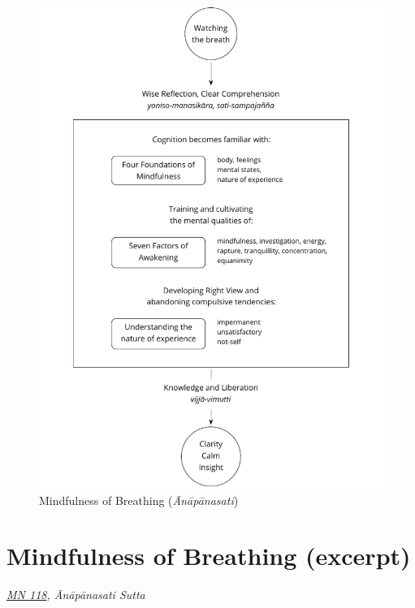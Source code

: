 \clearpage
\figurepagelayout

\begin{figure}[h]
\caption{Mindfulness of Breathing (\emph{Ānāpānasati})}\label{fig-mindfulness-of-breathing}
\bigskip
\includegraphics[width=\linewidth]{./manuscript/tex/diagrams/mindfulness-of-breathing.pdf}
\end{figure}

\clearpage
\normalpagelayout

\section{Mindfulness of Breathing (excerpt)}

{\centering
\emph{\href{https://suttacentral.net/mn118}{MN 118}, Ānāpānasati Sutta}
\par}

